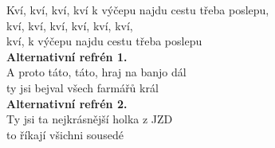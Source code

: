 Kví, kví, kví, kví k výčepu najdu cestu třeba poslepu, \\
kví, kví, kví, kví, kví, kví, \\
kví, k výčepu najdu cestu třeba poslepu\\

\textbf{Alternativní refrén 1.}\\
A proto táto, táto, hraj na banjo dál\\
ty jsi bejval všech farmářů král\\

\textbf{Alternativní refrén 2.}\\
Ty jsi ta nejkrásnější holka z JZD\\
to říkají všichni sousedé\\
